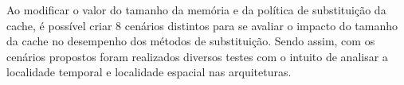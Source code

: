     Ao modificar o valor do tamanho da memória e da política de substituição da cache,
    é possível criar 8 cenários distintos para se avaliar o impacto do tamanho da cache
    no desempenho dos métodos de substituição. Sendo assim, com os cenários propostos
    foram realizados diversos testes com o intuito de analisar a localidade temporal e
    localidade espacial nas arquiteturas.